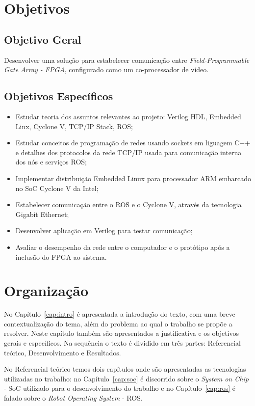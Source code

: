 \section{Objetivos}

\subsection{Objetivo Geral}

Desenvolver uma solução para estabelecer comunicação entre \textit{Field-Programmable Gate Array - FPGA}, 
configurado como um co-processador de vídeo.

\subsection{Objetivos Específicos}

\begin{itemize}
    \item Estudar teoria dos assuntos relevantes ao projeto: Verilog HDL, Embedded Linx,  Cyclone V, 
    TCP/IP Stack, ROS\@;
    \item Estudar conceitos de programação de redes usando sockets em liguagem C++ e detalhes dos protocolos da rede TCP/IP usada para comunicação interna dos nós e serviços ROS\@;
    \item Implementar distribuição Embedded Linux para processador ARM embarcado no SoC Cyclone V da Intel;
    \item Estabelecer comunicação entre o ROS e o Cyclone V, através da tecnologia Gigabit Ethernet;
    \item Desenvolver aplicação em Verilog para testar comunicação;
    \item Avaliar o desempenho da rede entre o computador e o protótipo após a inclusão do FPGA ao sistema.
\end{itemize}


\section{Organização}

No Capítulo~\ref{cap:intro} é apresentada a introdução do texto, com uma breve contextualização do tema, além do problema ao qual o trabalho se propõe a resolver. Neste capítulo também são apresentados a justificativa e os objetivos gerais e específicos. Na sequência o texto é dividido em três partes: Referencial teórico, Desenvolvimento e Resultados.

No Referencial teórico temos dois capítulos onde são apresentadas as tecnologias utilizadas no trabalho: no Capítulo~\ref{cap:soc} é discorrido sobre o \textit{System on Chip} - SoC utilizado para o desenvolvimento do trabalho e no Capítulo~\ref{cap:ros} é falado sobre o \textit{Robot Operating System} - ROS\@.

